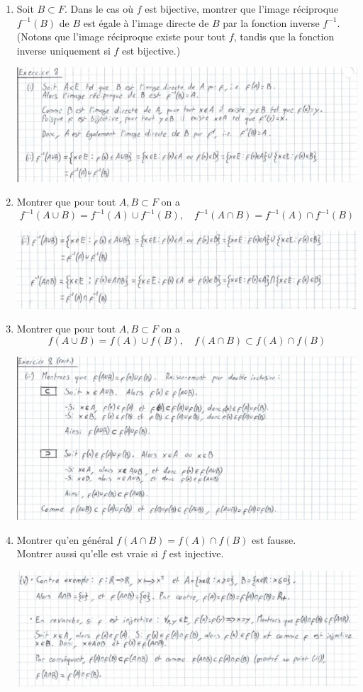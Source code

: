 \documentclass[a4paper, 10pt]{report}
\begin{document}
	\begin{enumerate}[label=(\roman*)]
		\item Soit $B \subset F$. Dans le cas où $f$ est bijective,
		montrer que l'image réciproque $f^{-1}(B)$ de $B$ est égale
		à l'image directe de $B$ par la fonction inverse $f^{-1}$.
		(Notons que l'image réciproque existe pour tout $f$, tandis
		que la fonction inverse uniquement si $f$ est bijective.)
		
		\includegraphics{ex08-1.jpg}
		\item Montrer que pour tout $A, B \subset F$ on a
		\[
			f^{-1}(A \cup B) = f^{-1}(A) \cup f^{-1}(B), \quad
			f^{-1}(A \cap B) = f^{-1}(A) \cap f^{-1}(B)
		\]
		
		\includegraphics{ex08-2.jpg}
		\item Montrer que pour tout $A, B \subset F$ on a
		\[
		f(A \cup B) = f(A) \cup f(B), \quad
		f(A \cap B) \subset f(A) \cap f(B)
		\]
		
		\includegraphics{ex08-3.jpg}
		\newpage
		\item Montrer qu'en général $f(A \cap B) = f(A) \cap f(B)$
		est fausse.\\
		Montrer aussi qu'elle est vraie si $f$ est injective.
		
		\includegraphics{ex08-4.jpg}
	\end{enumerate}
	
\end{document}
